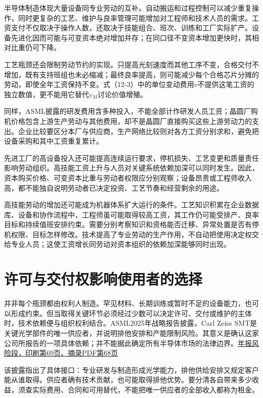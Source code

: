 \documentclass[UTF8,fontset=windows,12pt,a4paper,oneside,openany]{ctexbook}
\begin{document}
半导体制造体现大量设备同专业劳动的互补。自动搬运和过程控制可以减少重复操作，同时更复杂的工艺、维护与良率管理可能增加对工程师和技术人员的需求。工资支付不仅取决于操作人数，还取决于技能组合、班次、训练和工厂实际扩产。设备先进化因而可能与可变资本绝对增加并存；在同口径不变资本增加更快时，其相对比重仍可下降。

工艺瓶颈还会限制劳动节约的实现。只提高光刻速度而其他工序不变，合格交付不增加，既有支持班组也未必缩减；最终良率提高，则可能减少每个合格芯片分摊的劳动，即使全年工资保持不变。式（12-3）中的单位变动费用$v$不提供这笔工资的独立数值，更不能用它替代$v_M$讨论价值增殖。

同样，ASML披露的研发费用含多种投入，不能全部计作研发人员工资；晶圆厂购机价格包含上游生产劳动与其他费用，却不是晶圆厂直接购买这些上游劳动力的支出。企业比较要区分本厂与供应商，生产网络比较则对各方工资分别求和，避免把设备采购和其中工资重复累计。

先进工厂的高设备投入还可能提高连续运行要求，停机损失、工艺变更和质量责任影响劳动组织。高技能工资上升与人员对关键系统依赖加深可以同时发生。因此，资本购买价格、可变资本比重与劳动者权限应分别观察；设备昂贵或工程师收入高，都不能独自说明劳动者已决定投资、工艺节奏和经营剩余的用途。

高技能劳动的增加还可能成为机器体系扩大运行的条件。工艺知识积累在企业数据库、设备和协作流程中，工程师虽可能取得较高工资，其工作仍可能受排产、良率目标和持续值班安排约束。需要分别考察知识和资格能否迁移、异常处置是否有停机权限、目标怎样修改。技术提高了专业劳动的生产作用，不自动把使用决定权交给专业人员；这使工资增长同劳动对资本组织的依赖加深能够同时出现。

\section{许可与交付权影响使用者的选择}

并非每个瓶颈都由权利人制造。罕见材料、长期训练或暂时不足的设备能力，也可以形成约束。但当取得关键环节必须经过少数可以决定许可、交付或维护的主体时，技术依赖便与组织权利结合。ASML2025年战略报告披露，Carl Zeiss SMT是关键光学部件的唯一供应者，并说明排他安排和产能限制风险。其意义是确认这家公司所报告的一项具体依赖；并不能据此确定所有半导体市场的法律边界。\href{https://ourbrand.asml.com/m/8ab959d4926657b/original/asml-2025-annual-report-strategic-report-section.pdf}{年报风险段，印刷第69页、摘录PDF第68页}

该披露指出了具体接口：专业研发与制造形成光学能力，排他供给安排又规定客户能从谁取得。供应者确有技术贡献，也可能取得排他优势。要分清各自带来多少收益，须查实际费用、合同和可用替代，不能把唯一供应者的全部收入都称为租金。
\end{document}
